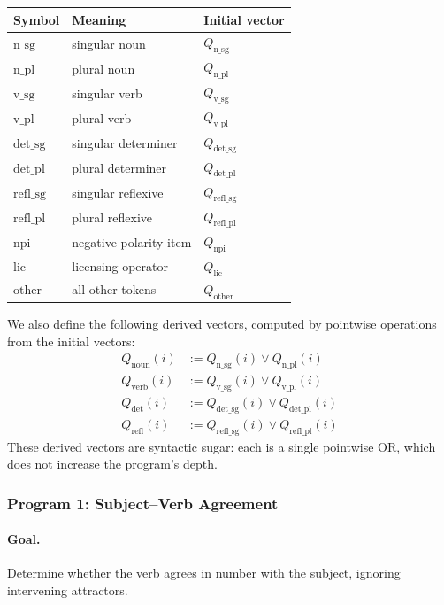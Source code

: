 \documentclass[11pt]{article}
\begin{document}
\begin{center}
\small
\begin{tabular}{@{}lll@{}}
\toprule
\textbf{Symbol} & \textbf{Meaning} & \textbf{Initial vector} \\
\midrule
$\text{n\_sg}$ & singular noun & $Q_\text{n\_sg}$ \\
$\text{n\_pl}$ & plural noun & $Q_\text{n\_pl}$ \\
$\text{v\_sg}$ & singular verb & $Q_\text{v\_sg}$ \\
$\text{v\_pl}$ & plural verb & $Q_\text{v\_pl}$ \\
$\text{det\_sg}$ & singular determiner & $Q_\text{det\_sg}$ \\
$\text{det\_pl}$ & plural determiner & $Q_\text{det\_pl}$ \\
$\text{refl\_sg}$ & singular reflexive & $Q_\text{refl\_sg}$ \\
$\text{refl\_pl}$ & plural reflexive & $Q_\text{refl\_pl}$ \\
$\text{npi}$ & negative polarity item & $Q_\text{npi}$ \\
$\text{lic}$ & licensing operator & $Q_\text{lic}$ \\
$\text{other}$ & all other tokens & $Q_\text{other}$ \\
\bottomrule
\end{tabular}
\end{center}

We also define the following derived vectors, computed by pointwise operations from the initial vectors:
\begin{align*}
Q_\text{noun}(i) &{:=} Q_\text{n\_sg}(i) \lor Q_\text{n\_pl}(i) \\
Q_\text{verb}(i) &{:=} Q_\text{v\_sg}(i) \lor Q_\text{v\_pl}(i) \\
Q_\text{det}(i)  &{:=} Q_\text{det\_sg}(i) \lor Q_\text{det\_pl}(i) \\
Q_\text{refl}(i) &{:=} Q_\text{refl\_sg}(i) \lor Q_\text{refl\_pl}(i)
\end{align*}
These derived vectors are syntactic sugar: each is a single pointwise OR, which does not increase the program's depth.

\subsubsection{Program 1: Subject--Verb Agreement}
\label{app:prog-agr}

\paragraph{Goal.} Determine whether the verb agrees in number with the subject, ignoring intervening attractors.
\end{document}
